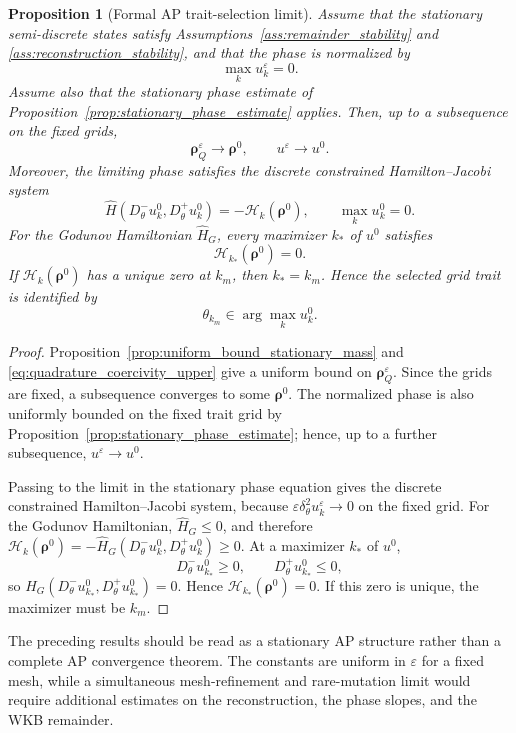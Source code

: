 \documentclass[11pt]{article}
\newtheorem{proposition}{Proposition}[section]
\begin{document}
\begin{proposition}[Formal AP trait-selection limit]
\label{prop:formal_AP_trait_selection}
Assume that the stationary semi-discrete states satisfy
Assumptions~\ref{ass:remainder_stability} and
\ref{ass:reconstruction_stability}, and that the phase is normalized by
\[
    \max_k u_k^\varepsilon=0 .
\]
Assume also that the stationary phase estimate of
Proposition~\ref{prop:stationary_phase_estimate} applies. Then, up to a
subsequence on the fixed grids,
\[
    \boldsymbol\rho_Q^\varepsilon\to \boldsymbol\rho^0,
    \qquad
    u^\varepsilon\to u^0 .
\]
Moreover, the limiting phase satisfies the discrete constrained
Hamilton--Jacobi system
\[
    \widehat H
    \left(
        D_\theta^-u_k^0,
        D_\theta^+u_k^0
    \right)
    =
    -\mathcal H_k(\boldsymbol\rho^0),
    \qquad
    \max_k u_k^0=0 .
\]
For the Godunov Hamiltonian \(\widehat H_G\), every maximizer \(k_*\) of
\(u^0\) satisfies
\[
    \mathcal H_{k_*}(\boldsymbol\rho^0)=0 .
\]
If \(\mathcal H_k(\boldsymbol\rho^0)\) has a unique zero at \(k_m\), then
\(k_*=k_m\). Hence the selected grid trait is identified by
\[
    \theta_{k_m}\in \arg\max_k u_k^0 .
\]
\end{proposition}

\begin{proof}
Proposition~\ref{prop:uniform_bound_stationary_mass} and
\eqref{eq:quadrature_coercivity_upper} give a uniform bound on
\(\boldsymbol\rho_Q^\varepsilon\). Since the grids are fixed, a subsequence
converges to some \(\boldsymbol\rho^0\). The normalized phase is also uniformly
bounded on the fixed trait grid by
Proposition~\ref{prop:stationary_phase_estimate}; hence, up to a further
subsequence, \(u^\varepsilon\to u^0\).

Passing to the limit in the stationary phase equation gives the discrete
constrained Hamilton--Jacobi system, because
\(\varepsilon\delta_\theta^2u_k^\varepsilon\to0\) on the fixed grid. For the
Godunov Hamiltonian, \(\widehat H_G\le0\), and therefore
\(
\mathcal H_k(\boldsymbol\rho^0)=-\widehat H_G(D_\theta^-u_k^0,D_\theta^+u_k^0)
\ge0
\).
At a maximizer \(k_*\) of \(u^0\),
\[
    D_\theta^-u_{k_*}^0\ge0,
    \qquad
    D_\theta^+u_{k_*}^0\le0,
\]
so \(\widehat H_G(D_\theta^-u_{k_*}^0,D_\theta^+u_{k_*}^0)=0\). Hence
\(\mathcal H_{k_*}(\boldsymbol\rho^0)=0\). If this zero is unique, the maximizer
must be \(k_m\).
\end{proof}

The preceding results should be read as a stationary AP structure rather than
a complete AP convergence theorem. The constants are uniform in
\(\varepsilon\) for a fixed mesh, while a simultaneous mesh-refinement and
rare-mutation limit would require additional estimates on the reconstruction,
the phase slopes, and the WKB remainder.
\end{document}
